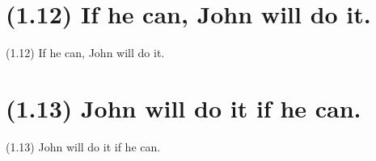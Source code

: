 \documentclass{article}
\begin{document}
\clearpage

%
%

\section*{(1.12) If he can, John will do it.}

\bigbreak
\begin{enumerate*}
\item[(1.12)] If he can, John will do it.
\end{enumerate*}
\bigbreak

\bigbreak
\begin{minipage}{\textwidth}
\end{minipage}
\bigbreak

\clearpage

%
%

\section*{(1.13) John will do it if he can.}

\bigbreak
\begin{enumerate*}
\item[(1.13)] John will do it if he can.
\end{enumerate*}
\bigbreak

\bigbreak
\begin{minipage}{\textwidth}
\end{minipage}
\bigbreak
\end{document}

